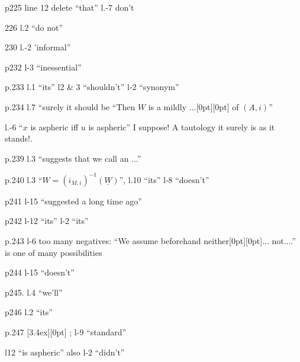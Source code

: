 \noindent\begin{minipage}{\linewidth}
\small
\setlength{\parindent}{0pt}
\setlength{\parskip}{2pt}

p225 line 12 delete ``that'' l.-7 don't

226 l.2 ``do not''

230 l.-2 'informal''

p232 l-3 ``inessential''

p.233 l.1 ``its'' l2 \& 3 ``shouldn't'' l-2 ``synonym''

p.234 l.7 ``surely it should be ``Then $W$ is a mildly ...\raisebox{1.3ex}[0pt][0pt]{}  of $(A,i)$''

 l.-6 ``$x$ is aspheric  iff $u$ is aspheric'' I suppose! A tautology it surely is as it stands!.

p.239 l.3 ``suggests that we call an ...''

p.240 l.3 ``$W=(i_{M,i})^{-1}(\underline{W})$'', l.10 ``its'' l-8 ``doesn't''

p241 l-15 ``suggested a long time ago''

p242 l-12 ``its'' l-2 ``its''

p.243 l-6 too many negatives: ``We assume beforehand neither\raisebox{1.1ex}[0pt][0pt]{}... not....'' is one of many possibilities

p244 l-15 ``doesn't''

p245. l.4 ``we'll''

p246 l.2 ``its''

p.247 
\raisebox{2.6ex}[3.4ex][0pt]{}
%
; l-9 ``standard''

l12 ``is aspheric''%
\quad also \qquad l-2 ``didn't''


\end{minipage}
